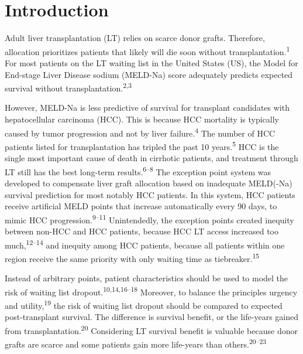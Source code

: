 \documentclass[11pt,english,]{book} %
\begin{document}
\linespread{1.213}
\normalsize
\newpage

\hypertarget{introduction-4}{%
\section*{Introduction}\label{introduction-4}}

Adult liver transplantation (LT) relies on scarce donor grafts. Therefore, allocation prioritizes patients that likely will die soon without transplantation.\textsuperscript{1} For most patients on the LT waiting list in the United States (US), the Model for End-stage Liver Disease sodium (MELD-Na) score adequately predicts expected survival without transplantation.\textsuperscript{2,3}

However, MELD-Na is less predictive of survival for transplant candidates with hepatocellular carcinoma (HCC). This is because HCC mortality is typically caused by tumor progression and not by liver failure.\textsuperscript{4} The number of HCC patients listed for transplantation has tripled the past 10 years.\textsuperscript{5} HCC is the single most important cause of death in cirrhotic patients, and treatment through LT still has the best long-term results.\textsuperscript{6--8} The exception point system was developed to compensate liver graft allocation based on inadequate MELD(-Na) survival prediction for most notably HCC patients. In this system, HCC patients receive artificial MELD points that increase automatically every 90 days, to mimic HCC progression.\textsuperscript{9--11} Unintendedly, the exception points created inequity between non-HCC and HCC patients, because HCC LT access increased too much,\textsuperscript{12--14} and inequity among HCC patients, because all patients within one region receive the same priority with only waiting time as tiebreaker.\textsuperscript{15}

Instead of arbitrary points, patient characteristics should be used to model the risk of waiting list dropout.\textsuperscript{10,14,16--18} Moreover, to balance the principles urgency and utility,\textsuperscript{19} the risk of waiting list dropout should be compared to expected post-transplant survival. The difference is survival benefit, or the life-years gained from transplantation.\textsuperscript{20} Considering LT survival benefit is valuable because donor grafts are scarce and some patients gain more life-years than others.\textsuperscript{20--23}
\end{document}
